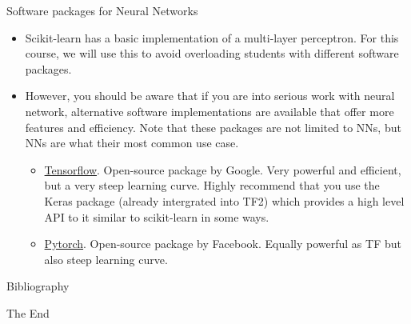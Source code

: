 \documentclass{beamer}
\begin{document}
\begin{frame}{Software packages for Neural Networks}
    \begin{itemize}
        \item Scikit-learn has a basic implementation of a multi-layer perceptron. For this course, we will use this to avoid overloading students with different software packages.
        \item However, you should be aware that if you are into serious work with neural network, alternative software implementations are available that offer more features and efficiency. Note that these packages are not limited to NNs, but NNs are what their most common use case.
        \begin{itemize}
            \item \href{https://www.tensorflow.org/}{Tensorflow}. Open-source package by Google. Very powerful and efficient, but a very steep learning curve. Highly recommend that you use the Keras package (already intergrated into TF2) which provides a high level API to it similar to scikit-learn in some ways.
            \item \href{https://pytorch.org/}{Pytorch}. Open-source package by Facebook. Equally powerful as TF but also steep learning curve.
        \end{itemize}
    \end{itemize}
\end{frame}


\begin{frame}{Bibliography}
    
    
\end{frame}




\begin{frame}
    \Huge{\centerline{The End}}
\end{frame}
\end{document}
